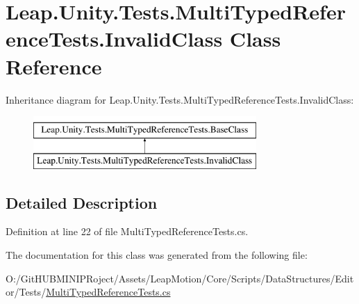 \hypertarget{class_leap_1_1_unity_1_1_tests_1_1_multi_typed_reference_tests_1_1_invalid_class}{}\section{Leap.\+Unity.\+Tests.\+Multi\+Typed\+Reference\+Tests.\+Invalid\+Class Class Reference}
\label{class_leap_1_1_unity_1_1_tests_1_1_multi_typed_reference_tests_1_1_invalid_class}
Inheritance diagram for Leap.\+Unity.\+Tests.\+Multi\+Typed\+Reference\+Tests.\+Invalid\+Class\+:\begin{figure}[H]
\begin{center}
\leavevmode
\includegraphics[height=2.000000cm]{class_leap_1_1_unity_1_1_tests_1_1_multi_typed_reference_tests_1_1_invalid_class}
\end{center}
\end{figure}


\subsection{Detailed Description}


Definition at line 22 of file Multi\+Typed\+Reference\+Tests.\+cs.



The documentation for this class was generated from the following file\+:\begin{DoxyCompactItemize}
\item 
O\+:/\+Git\+H\+U\+B\+M\+I\+N\+I\+P\+Roject/\+Assets/\+Leap\+Motion/\+Core/\+Scripts/\+Data\+Structures/\+Editor/\+Tests/\mbox{\hyperlink{_multi_typed_reference_tests_8cs}{Multi\+Typed\+Reference\+Tests.\+cs}}\end{DoxyCompactItemize}

